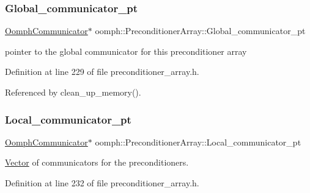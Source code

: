 \mbox{\label{classoomph_1_1PreconditionerArray_a6d5b7cce152e193ffeb4d30c593c6ae3}} 
\subsubsection{\texorpdfstring{Global\+\_\+communicator\+\_\+pt}{Global\_communicator\_pt}}
{\footnotesize\ttfamily \hyperlink{classoomph_1_1OomphCommunicator}{Oomph\+Communicator}$\ast$ oomph\+::\+Preconditioner\+Array\+::\+Global\+\_\+communicator\+\_\+pt\hspace{0.3cm}{\ttfamily [private]}}



pointer to the global communicator for this preconditioner array 



Definition at line 229 of file preconditioner\+\_\+array.\+h.



Referenced by clean\+\_\+up\+\_\+memory().

\mbox{\label{classoomph_1_1PreconditionerArray_a8a0fee7aa5e23878e57186dcef8c719d}} 
\subsubsection{\texorpdfstring{Local\+\_\+communicator\+\_\+pt}{Local\_communicator\_pt}}
{\footnotesize\ttfamily \hyperlink{classoomph_1_1OomphCommunicator}{Oomph\+Communicator}$\ast$ oomph\+::\+Preconditioner\+Array\+::\+Local\+\_\+communicator\+\_\+pt\hspace{0.3cm}{\ttfamily [private]}}



\hyperlink{classoomph_1_1Vector}{Vector} of communicators for the preconditioners. 



Definition at line 232 of file preconditioner\+\_\+array.\+h.



